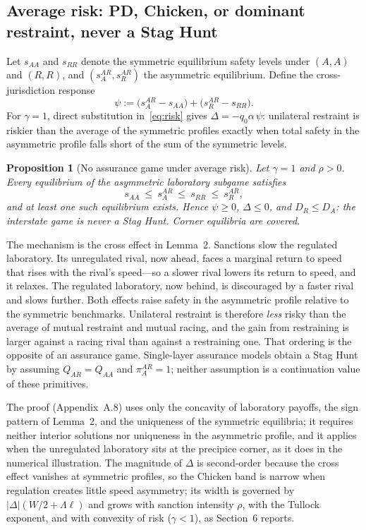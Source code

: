 \documentclass[11pt]{article}
\theoremstyle{plain}
\newtheorem{proposition}{Proposition}
\theoremstyle{definition}
\theoremstyle{remark}
\newcommand{\Lam}{\Lambda}
\newcommand{\Delt}{\Delta}
\begin{document}
\subsection{Average risk: PD, Chicken, or dominant restraint, never a Stag Hunt}

Let $s_{AA}$ and $s_{RR}$ denote the symmetric equilibrium safety levels under $(A,A)$ and $(R,R)$, and $(s^{AR}_A,s^{AR}_R)$ the asymmetric equilibrium. Define the cross-jurisdiction response
\begin{equation}
\psi:=\bigl(s^{AR}_A-s_{AA}\bigr)+\bigl(s^{AR}_R-s_{RR}\bigr).
\label{eq:psi}
\end{equation}
For $\gamma=1$, direct substitution in~\eqref{eq:risk} gives $\Delt=-q_0\alpha\,\psi$: unilateral restraint is riskier than the average of the symmetric profiles exactly when total safety in the asymmetric profile falls short of the sum of the symmetric levels.

\begin{proposition}[No assurance game under average risk]
Let $\gamma=1$ and $\rho>0$. Every equilibrium of the asymmetric laboratory subgame satisfies
\[
s_{AA}\ \le\ s^{AR}_A\ \le\ s_{RR}\ \le\ s^{AR}_R ,
\]
and at least one such equilibrium exists. Hence $\psi\ge0$, $\Delt\le0$, and $D_R\le D_A$: the interstate game is never a Stag Hunt. Corner equilibria are covered.
\end{proposition}

The mechanism is the cross effect in Lemma~2. Sanctions slow the regulated laboratory. Its unregulated rival, now ahead, faces a marginal return to speed that rises with the rival's speed---so a slower rival lowers its return to speed, and it relaxes. The regulated laboratory, now behind, is discouraged by a faster rival and slows further. Both effects raise safety in the asymmetric profile relative to the symmetric benchmarks. Unilateral restraint is therefore \emph{less} risky than the average of mutual restraint and mutual racing, and the gain from restraining is larger against a racing rival than against a restraining one. That ordering is the opposite of an assurance game. Single-layer assurance models obtain a Stag Hunt by assuming $Q_{AR}=Q_{AA}$ and $\pi_A^{AR}=1$; neither assumption is a continuation value of these primitives.

The proof (Appendix~A.8) uses only the concavity of laboratory payoffs, the sign pattern of Lemma~2, and the uniqueness of the symmetric equilibria; it requires neither interior solutions nor uniqueness in the asymmetric profile, and it applies when the unregulated laboratory sits at the precipice corner, as it does in the numerical illustration. The magnitude of $\Delt$ is second-order because the cross effect vanishes at symmetric profiles, so the Chicken band is narrow when regulation creates little speed asymmetry; its width is governed by $|\Delt|(W/2+\Lam\ell)$ and grows with sanction intensity $\rho$, with the Tullock exponent, and with convexity of risk ($\gamma<1$), as Section~6 reports.
\end{document}
